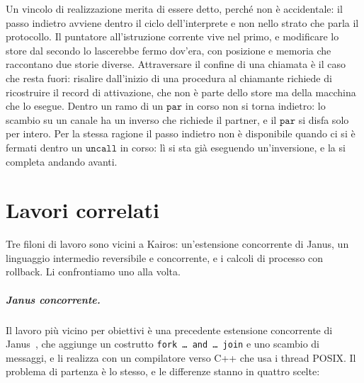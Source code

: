 Un vincolo di realizzazione merita di essere detto, perché non è accidentale: il
passo indietro avviene dentro il ciclo dell'interprete e non nello strato che
parla il protocollo. Il puntatore all'istruzione corrente vive nel primo, e
modificare lo store dal secondo lo lascerebbe fermo dov'era, con posizione e
memoria che raccontano due storie diverse. Attraversare il confine di una
chiamata è il caso che resta fuori: risalire dall'inizio di una procedura al
chiamante richiede di ricostruire il record di attivazione, che non è parte
dello store ma della macchina che lo esegue. Dentro un ramo di un
$\mathtt{par}$ in corso non si torna indietro: lo scambio su un canale ha un
inverso che richiede il partner, e il $\mathtt{par}$ si disfa solo per intero.
Per la stessa ragione il passo indietro non è disponibile quando ci si è
fermati dentro un $\mathtt{uncall}$ in corso: lì si sta già eseguendo
un'inversione, e la si completa andando avanti.

\chapter{Lavori correlati}
\label{chap:correlati}
\label{sec:related}

Tre filoni di lavoro sono vicini a Kairos: un'estensione concorrente di Janus,
un linguaggio intermedio reversibile e concorrente, e i calcoli di processo con
rollback. Li confrontiamo uno alla volta.

\paragraph{Janus concorrente.} Il lavoro più vicino per obiettivi è una
precedente estensione concorrente di Janus~\cite{Sammarchi2019}, che aggiunge un
costrutto \texttt{fork\,\dots\,and\,\dots\,join} e uno scambio di messaggi, e li
realizza con un compilatore verso C++ che usa i thread POSIX. Il problema di
partenza è lo stesso, e le differenze stanno in quattro scelte:

